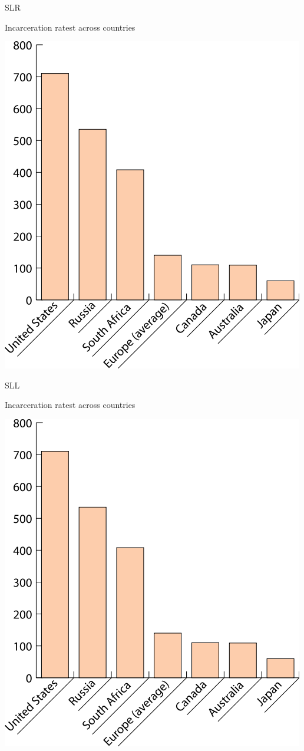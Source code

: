 \begin{chart}{S}{LR}
\caption{Incarceration ratest across countries}
\label{chart:incarceration}
\includegraphics[width=\chartwidth,height=\chartheight]{incarceration}  
\end{chart}

\begin{chart}{S}{LL}
\caption{Incarceration ratest across countries}
\label{chart:incarceration}
\includegraphics[width=\chartwidth,height=\chartheight]{incarceration}  
\end{chart}
